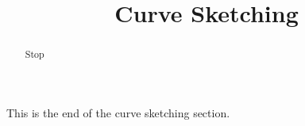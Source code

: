 \documentclass[handout]{ximera}
\title{Curve Sketching}
\begin{document}
\begin{abstract} Stop
\end{abstract}

\maketitle

This is the end of the curve sketching section.
\end{document}
